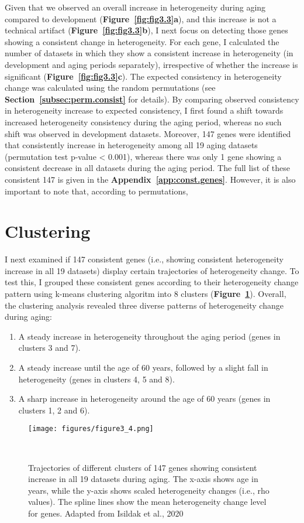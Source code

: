 Given that we observed an overall increase in heterogeneity during aging compared to development (\textbf{Figure~\ref{fig:fig3.3}a}),
and this increase is not a technical artifact (\textbf{Figure~\ref{fig:fig3.3}b}), I next focus on detecting those genes showing a consistent change in heterogeneity. 
For each gene, I calculated the number of datasets in which they show a  consistent increase in heterogeneity (in development and aging periods separately), 
irrespective of whether the increase is significant (\textbf{Figure~\ref{fig:fig3.3}c}).
The expected consistency in heterogeneity change was calculated using the random permutations (see \textbf{Section~\ref{subsec:perm.consist}} for details).
By comparing observed consistency in heterogeneity increase to expected consistency, I first found a shift towards increased heterogeneity consistency
during the aging period, whereas no such shift was observed in development datasets.
Moreover, 147 genes were identified that consistently increase in heterogeneity among all 19 aging datasets (permutation test p-value < 0.001), 
whereas there was only 1 gene showing a consistent decrease in all datasets during the aging period.
The full list of these consistent 147 is given in the \textbf{Appendix~\ref{app:const.genes}}.
However, it is also important to note that, according to permutations, 

\section{Clustering}
I next examined if 147 consistent genes (i.e., showing consistent heterogeneity increase in all 19 datasets) display certain trajectories of heterogeneity change.
To test this, I grouped these consistent genes according to their heterogeneity change pattern using k-means clustering algoritm into 8 clusters (\textbf{Figure~\ref{fig:fig3.4}}).
Overall, the clustering analysis revealed three diverse patterns of heterogeneity change during aging:

\begin{enumerate}
    \item A steady increase in heterogeneity throughout the aging period (genes in clusters 3 and 7).
    \item A steady increase until the age of 60 years, followed by a slight fall in heterogeneity (genes in clusters 4, 5 and 8).
    \item A sharp increase in heterogeneity around the age of 60 years (genes in clusters 1, 2 and 6).
\end{enumerate}


\begin{figure}[h]
    \centering
    \texttt{[image: figures/figure3\_4.png]}
    \caption{Trajectories of different clusters of 147 genes showing consistent increase in all 19 datasets during aging.
    The x-axis shows age in years, while the y-axis shows scaled heterogeneity changes (i.e., rho values).
    The spline lines show the mean heterogeneity change level for genes. 
    Adapted from Isildak et al., 2020
    }~\label{fig:fig3.4}
\end{figure}